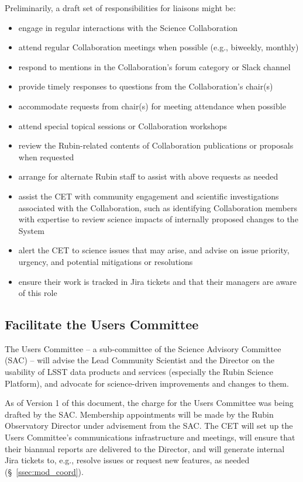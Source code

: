 \documentclass[DM,lsstdraft,toc]{lsstdoc}
\begin{document}
Preliminarily, a draft set of responsibilities for liaisons might be:
\begin{itemize}
\item engage in regular interactions with the Science Collaboration
\item attend regular Collaboration meetings when possible (e.g., biweekly, monthly)
\item respond to mentions in the Collaboration's forum category or Slack channel
\item provide timely responses to questions from the Collaboration's chair(s)
\item accommodate requests from chair(s) for meeting attendance when possible
\item attend special topical sessions or Collaboration workshops
\item review the Rubin-related contents of Collaboration publications or proposals when requested
\item arrange for alternate Rubin staff to assist with above requests as needed
\item assist the CET with community engagement and scientific investigations associated with the Collaboration, such as identifying Collaboration members with expertise to review science impacts of internally proposed changes to the System
\item alert the CET to science issues that may arise, and advise on issue priority, urgency, and potential mitigations or resolutions
\item ensure their work is tracked in Jira tickets and that their managers are aware of this role
\end{itemize}


\subsection{Facilitate the Users Committee}\label{ssec:mod_uc}

The Users Committee -- a sub-committee of the Science Advisory Committee (SAC) -- will advise the Lead Community Scientist and the Director on the usability of LSST data products and services (especially the Rubin Science Platform), and advocate for science-driven improvements and changes to them.

As of Version 1 of this document, the charge for the Users Committee was being drafted by the SAC.
Membership appointments will be made by the Rubin Observatory Director under advisement from the SAC.
The CET will set up the Users Committee's communications infrastructure and meetings, will ensure that their biannual reports are delivered to the Director, and will generate internal Jira tickets to, e.g., resolve issues or request new features, as needed (\S~\ref{ssec:mod_coord}). 
\end{document}
